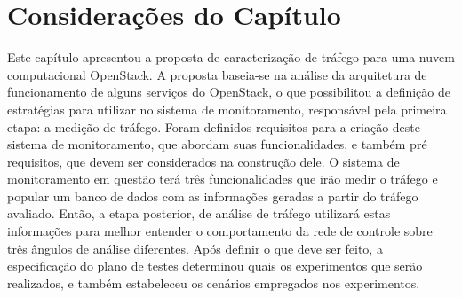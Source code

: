     
\section{Considerações do Capítulo}
\label{cap3:consideracoes}

Este capítulo apresentou a proposta de caracterização de tráfego para uma nuvem computacional OpenStack.
%
A proposta baseia-se na análise da arquitetura de funcionamento de alguns serviços do OpenStack, o que possibilitou a definição de estratégias para utilizar no sistema de monitoramento, responsável pela primeira etapa: a medição de tráfego.
%
Foram definidos requisitos para a criação deste sistema de monitoramento, que abordam suas funcionalidades, e também pré requisitos, que devem ser considerados na construção dele.
%
O sistema de monitoramento em questão terá três funcionalidades que irão medir o tráfego e popular um banco de dados com as informações geradas a partir do tráfego avaliado.
%
Então, a etapa posterior, de análise de tráfego utilizará estas informações para melhor entender o comportamento da rede de controle sobre três ângulos de análise diferentes.
%
Após definir o que deve ser feito, a especificação do plano de testes determinou quais os experimentos que serão realizados, e também estabeleceu os cenários empregados nos experimentos.